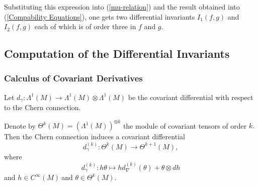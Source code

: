 \documentclass{article}
\begin{document}
Substituting this expression into (\ref{mu-relation}) and the result
obtained into (\ref{Compability Equations}), one gets two differential
invariants $I_{1}\left( f,g\right) $ and $I_{2}\left( f,g\right) $ each of
which is of order three in $f$ and $g.$\bigskip

\subsection{Computation of the Differential Invariants}

\subsubsection{ Calculus of Covariant Derivatives}

Let $d_{\gamma }:\Lambda ^{1}(M)\rightarrow \Lambda ^{1}\left( M\right)
\otimes \Lambda ^{1}\left( M\right) $ be the covariant differential with
respect to the Chern connection.

Denote by $\Theta ^{k}\left( M\right) =\left( \Lambda ^{1}\left( M\right)
\right) ^{\otimes k}$ the module of covariant tensors of order $k.$ Then the
Chern connection induces a covariant differential
\begin{equation*}
d_{\gamma }^{(k)}:\Theta ^{k}\left( M\right) \rightarrow \Theta ^{k+1}\left(
M\right) ,
\end{equation*}%
where
\begin{equation*}
d_{\gamma }^{(k)}:h\theta \longmapsto hd_{\nabla }^{(k)}\left( \theta
\right) +\theta \otimes dh
\end{equation*}%
and $h\in C^{\infty }\left( M\right) \ $and $\theta \in \Theta ^{k}\left(
M\right) .$
\end{document}
